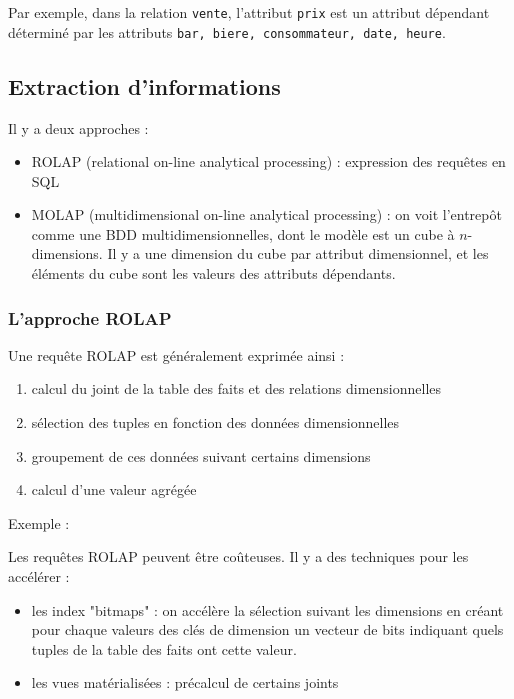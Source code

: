 		Par exemple, dans la relation \texttt{vente}, l'attribut \texttt{prix} est un attribut dépendant déterminé par les attributs \texttt{bar, biere, consommateur, date, heure}.
	
	
		\subsection{Extraction d'informations}
		
		Il y a deux approches :
		
		\begin{itemize}
			\item ROLAP (relational on-line analytical processing) : expression des requêtes en SQL
			\item MOLAP (multidimensional on-line analytical processing) : on voit l'entrepôt comme une BDD multidimensionnelles, dont le modèle est un cube à $n$-dimensions. Il y a une dimension du cube par attribut dimensionnel, et les éléments du cube sont les valeurs des attributs dépendants.
		\end{itemize}
		
			\subsubsection{L'approche ROLAP}
			
			Une requête ROLAP est généralement exprimée ainsi :
			
			\begin{enumerate}
				\item calcul du joint de la table des faits et des relations dimensionnelles
				\item sélection des tuples en fonction des données dimensionnelles
				\item groupement de ces données suivant certains dimensions
				\item calcul d'une valeur agrégée
			\end{enumerate}
			
			Exemple :
			
			
			Les requêtes ROLAP peuvent être coûteuses. Il y a des techniques pour les accélérer :
			
			\begin{itemize}
				\item les index "bitmaps" : on accélère la sélection suivant les dimensions en créant pour chaque valeurs des clés de dimension un vecteur de bits indiquant quels tuples de la table des faits ont cette valeur.
				\item les vues matérialisées : précalcul de certains joints
			\end{itemize}
			
